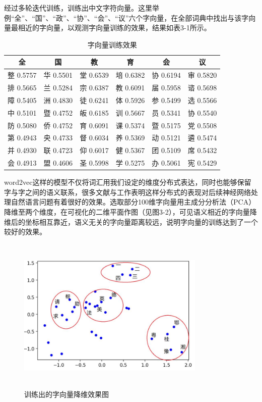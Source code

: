 \documentclass[winfonts,master,oneside,nobackinfo]{njuthesis}
\begin{document}
经过多轮迭代训练，训练出中文字符向量。这里举例“全”、“国”、“政”、“协”、“会”、“议”六个字向量，在全部词典中找出与该字向量最相近的字向量，以观测字向量训练的效果，结果如表3-1所示。

\begin{table}[H]
\centering
\begin{tabular}{cccccc} %
\hline 
全& 国& 教& 育& 会& 议\\
\hline  
整 0.5757& 华 0.5501& 堂 0.6539& 培 0.6382&协 0.6194&审 0.5820\\
排 0.5665& 兰 0.5284& 宗 0.6387& 教 0.6091&届 0.5958&谘 0.5698\\
障 0.5405& 洲 0.4830& 徒 0.6241& 体 0.5926&参 0.5499&选 0.5566\\
中 0.5101& 暨 0.4752& 皈 0.6185& 训 0.5667&员 0.5341&协 0.5540\\
防 0.5080& 侨 0.4752& 育 0.6091& 课 0.5374&暨 0.5175&党 0.5508\\
第 0.4943& 央 0.4733& 督 0.6034& 养 0.5369&动 0.5121&遴 0.5474\\
并 0.4930& 联 0.4723& 仰 0.6017& 健 0.5367&团 0.5109&席 0.5432\\
会 0.4913& 盟 0.4606& 圣 0.5998& 学 0.5275&办 0.5061&宪 0.5429\\
\hline 
\end{tabular}
\caption{字向量训练效果}
\end{table}



word2vec这样的模型不仅将词汇用我们设定的维度分布式表达，同时也能够保留字与字之间的语义联系，很多文献\cite{Yoon}与工作表明这样分布式的表现对后续神经网络处理自然语言问题有着很好的效果。选取部分100维字向量用主成分分析法（PCA）降维至两个维度，在可视化的二维平面作图（见图3-2），可见语义相近的字向量降维后的坐标相互靠近，语义无关的字向量距离较远，说明字向量的训练达到了一个较好的效果。

\begin{figure}[H]
\centering
\begin{minipage}[t]{\textwidth}
\includegraphics[width=0.8\textwidth,height=7.5cm]{./figure/字向量降维.jpg}
\caption{训练出的字向量降维效果图}
\label{lab:1}
\end{minipage}
\end{figure}
\end{document}

